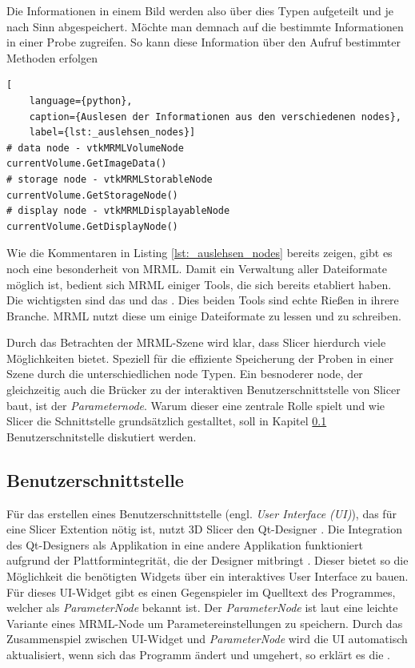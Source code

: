 Die Informationen in einem Bild werden also über dies Typen aufgeteilt und je
nach Sinn abgespeichert. Möchte man demnach auf die bestimmte Informationen in einer
Probe zugreifen. So kann diese Information über den Aufruf bestimmter Methoden
erfolgen

\begin{lstlisting}[
	language={python},
	caption={Auslesen der Informationen aus den verschiedenen nodes},
	label={lst:_auslehsen_nodes}]
# data node - vtkMRMLVolumeNode
currentVolume.GetImageData()
# storage node - vtkMRMLStorableNode
currentVolume.GetStorageNode()
# display node - vtkMRMLDisplayableNode
currentVolume.GetDisplayNode()
\end{lstlisting}

Wie die Kommentaren in Listing \ref{lst:_auslehsen_nodes} bereits zeigen, gibt es
noch eine besonderheit von MRML. Damit ein Verwaltung aller Dateiformate möglich
ist, bedient sich MRML einiger Tools, die sich bereits etabliert haben. Die wichtigsten
sind das \citet{vtk2024} und das \citet{itk2024}. Dies beiden Tools sind echte
Rießen in ihrere Branche. MRML nutzt diese um einige Dateiformate zu lessen und zu
schreiben.

Durch das Betrachten der MRML-Szene wird klar, dass Slicer hierdurch viele
Möglichkeiten bietet. Speziell für die effiziente Speicherung der Proben in einer
Szene durch die unterschiedlichen node Typen. Ein besnoderer node, der gleichzeitig
auch die Brücker zu der interaktiven Benutzerschnittstelle von Slicer baut, ist
der \textit{Parameternode}. Warum dieser eine zentrale Rolle spielt und wie
Slicer die Schnittstelle grundsätzlich gestalltet, soll in Kapitel \ref{subsec:benutzerschnitstelle}
Benutzerschnitstelle diskutiert werden.

\subsection{Benutzerschnittstelle}
\label{subsec:benutzerschnitstelle} Für das erstellen eines Benutzerschnittstelle
(engl. \textit{User Interface (UI)}), das für eine Slicer Extention nötig ist, nutzt
3D Slicer den Qt-Designer \citep[vgl.][]{qt2024}. Die Integration des Qt-Designers
als Applikation in eine andere Applikation funktioniert aufgrund der Plattformintegrität,
die der Designer mitbringt \citep[vgl.][]{qt2024}. Dieser bietet so die
Möglichkeit die benötigten Widgets über ein interaktives User Interface zu bauen.
Für dieses UI-Widget gibt es einen Gegenspieler im Quelltext des Programmes,
welcher als \textit{ParameterNode} bekannt ist. Der \textit{ParameterNode} ist laut
\citet{slicer2024} eine leichte Variante eines MRML-Node um
Parametereinstellungen zu speichern. Durch das Zusammenspiel zwischen UI-Widget und
\textit{ParameterNode} wird die UI automatisch aktualisiert, wenn sich das Programm
ändert und umgehert, so erklärt es die \citet{slicer2024}.

